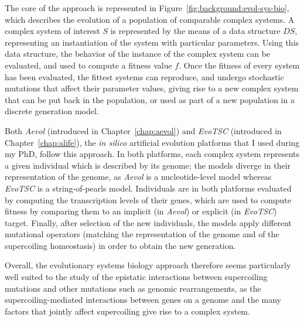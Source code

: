 The core of the approach is represented in Figure~\ref{fig:background:evol-sys-bio}, which describes the evolution of a population of comparable complex systems.
A complex system of interest $S$ is represented by the means of a data structure $DS$, representing an instantiation of the system with particular parameters.
Using this data structure, the behavior of the instance of the complex system can be evaluated, and used to compute a fitness value $f$.
Once the fitness of every system has been evaluated, the fittest systems can reproduce, and undergo stochastic mutations that affect their parameter values, giving rise to a new complex system that can be put back in the population, or used as part of a new population in a discrete generation model.

Both \emph{Aevol} (introduced in Chapter~\ref{chap:aevol}) and \emph{EvoTSC} (introduced in Chapter~\ref{chap:alife}), the \emph{in silico} artificial evolution platforms that I used during my PhD, follow this approach.
In both platforms, each complex system represents a given individual which is described by its genome; the models diverge in their representation of the genome, as \emph{Aevol} is a nucleotide-level model whereas \emph{EvoTSC} is a string-of-pearls model.
Individuals are in both platforms evaluated by computing the transcription levels of their genes, which are used to compute fitness by comparing them to an implicit (in \emph{Aevol}) or explicit (in \emph{EvoTSC}) target.
Finally, after selection of the new individuals, the models apply different mutational operators (matching the representation of the genome and of the supercoiling homeostasis) in order to obtain the new generation.

Overall, the evolutionary systems biology approach therefore seems particularly well suited to the study of the epistatic interactions between supercoiling mutations and other mutations such as genomic rearrangements, as the supercoiling-mediated interactions between genes on a genome and the many factors that jointly affect supercoiling give rise to a complex system.
